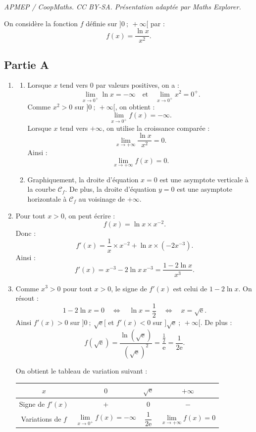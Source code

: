 \documentclass[10pt]{article}
\providecommand{\e}{{\mathrm{e}}}
\begin{document}
\noindent\textit{APMEP / CoopMaths. CC BY-SA. Présentation adaptée par Maths Explorer.}\par\medskip
On considère la fonction $f$ définie sur $]0~;~+\infty[$ par :
\[
f(x)=\dfrac{\ln x}{x^2}.
\]

\subsection*{Partie A}

\begin{enumerate}
	\item \begin{enumerate}
			\item Lorsque $x$ tend vers $0$ par valeurs positives, on a :
			\[
			\lim\limits_{x\to 0^+}\ln x=-\infty
			\quad\text{et}\quad
			\lim\limits_{x\to 0^+}x^2=0^+.
			\]
			Comme $x^2>0$ sur $]0~;~+\infty[$, on obtient :
			\[
			\lim\limits_{x\to 0^+} f(x)=-\infty.
			\]
			Lorsque $x$ tend vers $+\infty$, on utilise la croissance comparée :
			\[
			\lim\limits_{x\to +\infty}\dfrac{\ln x}{x^2}=0.
			\]
			Ainsi :
			\[
			\lim\limits_{x\to +\infty} f(x)=0.
			\]

		\item Graphiquement, la droite d'équation $x=0$ est une asymptote verticale à la courbe $\mathcal C_f$.
		De plus, la droite d'équation $y=0$ est une asymptote horizontale à $\mathcal C_f$ au voisinage de $+\infty$.
	\end{enumerate}

	\item Pour tout $x>0$, on peut écrire :
	\[
	f(x)=\ln x\times x^{-2}.
	\]
	Donc :
	\[
	f'(x)=\dfrac1x\times x^{-2}+\ln x\times\left(-2x^{-3}\right).
	\]
	Ainsi :
	\[
	f'(x)=x^{-3}-2\ln x\,x^{-3}=\dfrac{1-2\ln x}{x^3}.
	\]

	\item Comme $x^3>0$ pour tout $x>0$, le signe de $f'(x)$ est celui de $1-2\ln x$.
	On résout :
	\[
	1-2\ln x=0
	\quad\Longleftrightarrow\quad
	\ln x=\dfrac12
	\quad\Longleftrightarrow\quad
	x=\sqrt{\e}.
	\]
	Ainsi $f'(x)>0$ sur $]0~;~\sqrt\e[$ et $f'(x)<0$ sur $]\sqrt\e~;~+\infty[$.
	De plus :
	\[
	f(\sqrt\e)=\dfrac{\ln(\sqrt\e)}{(\sqrt\e)^2}
	=\dfrac{\frac12}{\e}
	=\dfrac{1}{2\e}.
	\]

		On obtient le tableau de variation suivant :

		\begin{center}
		\renewcommand{\arraystretch}{1.4}
		\begin{tabular}{|c|ccc|}
		\hline
		$x$ & $0$ & $\sqrt\e$ & $+\infty$ \\
		\hline
		Signe de $f'(x)$ & $+$ & $0$ & $-$ \\
		\hline
		Variations de $f$ &
		$\lim\limits_{x\to 0^+} f(x)=-\infty$
		& $\dfrac{1}{2\e}$
		& $\lim\limits_{x\to +\infty} f(x)=0$ \\
		\hline
		\end{tabular}
		\end{center}


\end{enumerate}
\end{document}
